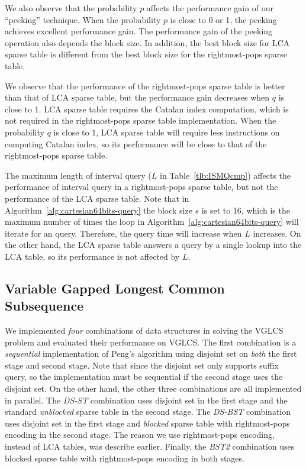 

We also observe that the probability $p$ affects the performance gain
of our ``peeking'' technique.  When the probability $p$ is close to 0
or 1, the peeking achieves excellent performance gain.  The
performance gain of the peeking operation also depends the block size.
In addition, the best block size for LCA sparse table is different
from the best block size for the rightmost-pops sparse table.

We observe that the performance of the rightmost-pops sparse table is
better than that of LCA sparse table, but the performance gain decreases
when $q$ is close to 1.  LCA sparse table requires the Catalan index
computation, which is not required in the rightmost-pops sparse table
implementation.  When the probability $q$ is close to 1, LCA sparse
table will require less instructions on computing Catalan index, so its
performance will be close to that of the rightmost-pops sparse table.

The maximum length of interval query ($L$ in Table~\ref{tlb:ISMQcmp})
affects the performance of interval query in a rightmost-pops sparse
table, but not the performance of the LCA sparse table.  Note that in
Algorithm~\ref{alg:cartesian64bits-query} the block size $s$ is set to
16, which is the maximum number of times the loop in
Algorithm~\ref{alg:cartesian64bits-query} will iterate for an query.
Therefore, the query time will increase when $L$ increases.  On the
other hand, the LCA sparse table answers a query by a single lookup
into the LCA table, so its performance is not affected by $L$.

\subsection{Variable Gapped Longest Common Subsequence}

We implemented {\em four} combinations of data structures in solving the
VGLCS problem and evaluated their performance on VGLCS.  The first
combination is a {\em sequential} implementation of Peng's algorithm
using disjoint set on {\em both} the first stage and second stage. Note
that since the disjoint set only supports suffix query, so the
implementation must be sequential if the second stage uses the disjoint
set.  On the other hand, the other three combinations are all
implemented in parallel. The {\em DS-ST} combination uses disjoint set
in the first stage and the standard {\em unblocked} sparse table in the
second stage.  The {\em DS-BST} combination uses disjoint set in the
first stage and {\em blocked} sparse table with rightmost-pops encoding
in the second stage.  The reason we use rightmost-pops encoding, instead
of LCA tables, was describe earlier.  Finally, the {\em BST2}
combination uses blocked sparse table with rightmost-pops encoding in
both stages.

